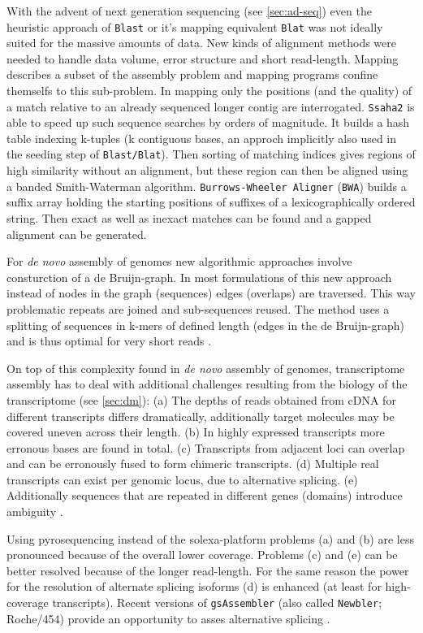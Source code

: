 With the advent of next generation sequencing (see \ref{sec:ad-seq})
even the heuristic approach of \texttt{Blast} or it's mapping
equivalent \texttt{Blat} \cite{pmid11932250} was not ideally suited
for the massive amounts of data. New kinds of alignment methods were
needed to handle data volume, error structure and short read-length.
Mapping describes a subset of the assembly problem and mapping
programs confine themselfs to this sub-problem. In mapping only the
positions (and the quality) of a match relative to an already
sequenced longer contig are interrogated. \texttt{Ssaha2}
\cite{pmid11591649} is able to speed up such sequence searches by
orders of magnitude. It builds a hash table indexing k-tuples (k
contiguous bases, an approch implicitly also used in the seeding step
of \texttt{Blast/Blat}). Then sorting of matching indices gives
regions of high similarity without an alignment, but these region can
then be aligned using a banded Smith-Waterman
algorithm. \texttt{Burrows-Wheeler Aligner} (\texttt{BWA})
\cite{pmid20080505} builds a suffix array holding the starting
positions of suffixes of a lexicographically ordered string. Then
exact as well as inexact matches can be found and a gapped alignment
can be generated.

For \textit{de novo} assembly of genomes new algorithmic approaches
involve consturction of a de Bruijn-graph. In most formulations of
this new approach instead of nodes in the graph (sequences) edges
(overlaps) are traversed. This way problematic repeats are joined and
sub-sequences reused. The method uses a splitting of sequences in
k-mers of defined length (edges in the de Bruijn-graph) and is thus
optimal for very short reads \cite{pmid18349386}.

On top of this complexity found in \textit{de novo} assembly of
genomes, transcriptome assembly has to deal with additional challenges
resulting from the biology of the transcriptome (see \ref{sec:dm}):
(a) The depths of reads obtained from cDNA for different transcripts
differs dramatically, additionally target molecules may be covered
uneven across their length. (b) In highly expressed transcripts more
erronous bases are found in total. (c) Transcripts from adjacent loci
can overlap and can be erronously fused to form chimeric
transcripts. (d) Multiple real transcripts can exist per genomic
locus, due to alternative splicing. (e) Additionally sequences that
are repeated in different genes (domains) introduce ambiguity
\cite{pmid21572440}.

Using pyrosequencing instead of the solexa-platform problems (a) and
(b) are less pronounced because of the overall lower
coverage. Problems (c) and (e) can be better resolved because of the
longer read-length. For the same reason the power for the resolution
of alternate splicing isoforms (d) is enhanced (at least for
high-coverage transcripts). Recent versions of \texttt{gsAssembler}
(also called \texttt{Newbler}; Roche/454) provide an opportunity to
asses alternative splicing \cite{pmid21138572}.

